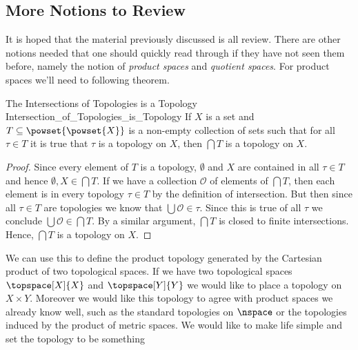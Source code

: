 \documentclass{book}                                                           %
\begin{document}
            \subsection{More Notions to Review}
                It is hoped that the material previously discussed is all
                review. There are other notions needed that one should quickly
                read through if they have not seen them before, namely the
                notion of \textit{product spaces} and \textit{quotient spaces}.
                For product spaces we'll need to following theorem.
                \begin{ltheorem}{The Intersections of Topologies is a Topology}
                                {Intersection_of_Topologies_is_Topology}
                    If $X$ is a set and $T\subseteq\powset{\powset{X}}$ is a
                    non-empty collection of sets such that for all $\tau\in{T}$
                    it is true that $\tau$ is a topology on $X$, then
                    $\bigcap{T}$ is a topology on $X$.
                \end{ltheorem}
                \begin{proof}
                    Since every element of $T$ is a topology, $\emptyset$ and
                    $X$ are contained in all $\tau\in{T}$ and hence
                    $\emptyset,X\in\bigcap{T}$. If we have a collection
                    $\mathcal{O}$ of elements of $\bigcap{T}$, then each element
                    is in every topology $\tau\in{T}$ by the definition of
                    intersection. But then since all $\tau\in{T}$ are topologies
                    we know that $\bigcup\mathcal{O}\in\tau$. Since this is true
                    of all $\tau$ we conclude $\bigcup\mathcal{O}\in\bigcap{T}$.
                    By a similar argument, $\bigcap{T}$ is closed to finite
                    intersections. Hence, $\bigcap{T}$ is a topology on $X$.
                \end{proof}
                We can use this to define the product topology generated by the
                Cartesian product of two topological spaces. If we have two
                topological spaces $\topspace[X]{X}$ and $\topspace[Y]{Y}$ we
                would like to place a topology on $X\times{Y}$. Moreover we
                would like this topology to agree with product spaces we already
                know well, such as the standard topologies on $\nspace$ or the
                topologies induced by the product of metric spaces. We would
                like to make life simple and set the topology to be something
\end{document}
